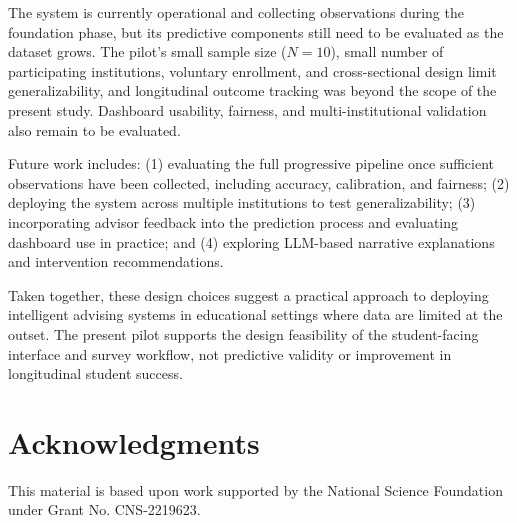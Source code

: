 \documentclass[letterpaper,11pt]{article}
\begin{document}
The system is currently operational and collecting observations during the foundation phase, but its predictive components still need to be evaluated as the dataset grows. %
The pilot's small sample size ($N=10$), small number of participating institutions, voluntary enrollment, and cross-sectional design limit generalizability, and longitudinal outcome tracking was beyond the scope of the present study. Dashboard usability, fairness, and multi-institutional validation also remain to be evaluated.

Future work includes: (1) evaluating the full progressive pipeline once sufficient observations have been collected, including accuracy, calibration, and fairness; (2) deploying the system across multiple institutions to test generalizability; (3) incorporating advisor feedback into the prediction process and evaluating dashboard use in practice; and (4) exploring LLM-based narrative explanations and intervention recommendations.

Taken together, these design choices suggest a practical approach to deploying intelligent advising systems in educational settings where data are limited at the outset. The present pilot supports the design feasibility of the student-facing interface and survey workflow, not predictive validity or improvement in longitudinal student success.


\section{Acknowledgments}
\small

This material is based upon work supported by the National Science Foundation under Grant No. CNS-2219623.

\begin{sloppypar}
\printbibliography[title={REFERENCES}]
\end{sloppypar}
\end{document}
